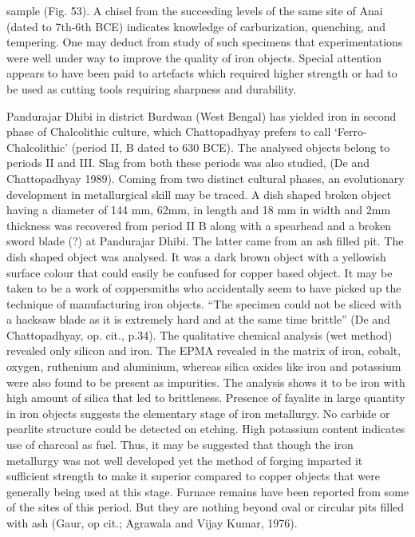 sample (Fig. 53). A chisel from the succeeding levels of the same site of Anai (dated to 7th-6th BCE) indicates knowledge of carburization, quenching, and tempering. One may deduct from study of such specimens that experimentations were well under way to improve the quality of iron objects. Special attention appears to have been paid to artefacts which required higher strength or had to be used as cutting tools requiring sharpness and durability.

Pandurajar Dhibi in district Burdwan (West Bengal) has yielded iron in second phase of Chalcolithic culture, which Chattopadhyay prefers to call ‘Ferro-Chalcolithic’ (period II, B dated to 630 BCE). The analysed objects belong to periods II and III. Slag from both these periods was also studied, (De and Chattopadhyay 1989). Coming from two distinct cultural phases, an evolutionary development in metallurgical skill may be traced. A dish shaped broken object having a diameter of 144 mm, 62mm, in length and 18 mm in width and 2mm thickness was recovered from period II B along with a spearhead and a broken sword blade (?) at Pandurajar Dhibi. The latter came from an ash filled pit. The dish shaped object was analysed. It was a dark brown object with a yellowish surface colour that could easily be confused for copper based object. It may be taken to be a work of coppersmiths who accidentally seem to have picked up the technique of manufacturing iron objects. “The specimen could not be sliced with a hacksaw blade as it is extremely hard and at the same time brittle” (De and Chattopadhyay, op. cit., p.34). The qualitative chemical analysis (wet method) revealed only silicon and iron. The EPMA revealed in the matrix of iron, cobalt, oxygen, ruthenium and aluminium, whereas silica oxides like iron and potassium were also found to be present as impurities. The analysis shows it to be iron with high amount of silica that led to brittleness. Presence of fayalite in large quantity in iron objects suggests the elementary stage of iron metallurgy. No carbide or pearlite structure could be detected on etching. High potassium content indicates use of charcoal as fuel. Thus, it may be suggested that though the iron metallurgy was not well developed yet the method of forging imparted it sufficient strength to make it superior compared to copper objects that were generally being used at this stage. Furnace remains have been reported from some of the sites of this period. But they are nothing beyond oval or circular pits filled with ash (Gaur, op cit.; Agrawala and Vijay Kumar, 1976).

